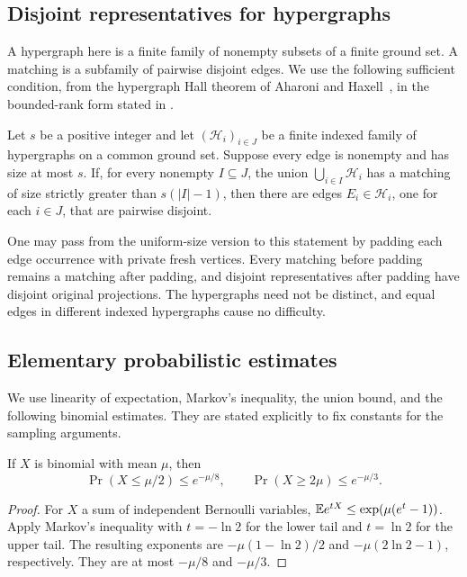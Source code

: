\subsection{Disjoint representatives for hypergraphs}

A hypergraph here is a finite family of nonempty subsets of a
finite ground set. A matching is a subfamily of pairwise
disjoint edges. We use the following sufficient condition,
from the hypergraph Hall theorem of Aharoni and
Haxell~\cite{AH2000}, in the bounded-rank form stated in
\cite[Theorem~6]{BM2024}.

\begin{theorem}\label{thm:aharoni-haxell}
Let \(s\) be a positive integer and let
\((\mathcal H_i)_{i\in J}\) be a finite indexed family of
hypergraphs on a common ground set. Suppose every edge is
nonempty and has size at most \(s\). If, for every nonempty
\(I\subseteq J\), the union
\(\bigcup_{i\in I}\mathcal H_i\) has a matching of size
strictly greater than \(s(|I|-1)\), then there are edges
\(E_i\in\mathcal H_i\), one for each \(i\in J\), that are
pairwise disjoint.
\end{theorem}

One may pass from the uniform-size version to this statement
by padding each edge occurrence with private fresh vertices.
Every matching before padding remains a matching after padding,
and disjoint representatives after padding have disjoint
original projections. The hypergraphs need not be distinct, and equal
edges in different indexed hypergraphs cause no difficulty.

\subsection{Elementary probabilistic estimates}

We use linearity of expectation, Markov's inequality, the union
bound, and the following binomial estimates. They are stated
explicitly to fix constants for the sampling arguments.

\begin{lemma}\label{lem:chernoff}
If \(X\) is binomial with mean \(\mu\), then
\[
 \Pr(X\le\mu/2)\le e^{-\mu/8},
 \qquad
 \Pr(X\ge2\mu)\le e^{-\mu/3}.
\]
\end{lemma}

\begin{proof}
For \(X\) a sum of independent Bernoulli variables,
\(\mathbb E e^{tX}\le\exp(\mu(e^t-1))\).
Apply Markov's inequality with \(t=-\ln2\) for the lower
tail and \(t=\ln2\) for the upper tail. The resulting exponents
are \(-\mu(1-\ln2)/2\) and \(-\mu(2\ln2-1)\),
respectively. They are at most \(-\mu/8\) and \(-\mu/3\).
\end{proof}
